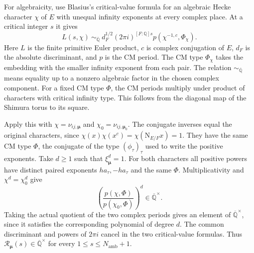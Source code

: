 For algebraicity, use Blasius's critical-value formula for an
algebraic Hecke character \(\chi\) of \(E\) with unequal infinity
exponents at every complex place. At a critical integer \(s\) it gives
\[
  L(s,\chi)\ \sim_{\overline{\mathbb Q}}\
    d_F^{1/2}(2\pi i)^{[F:\mathbb Q]s}
    p(\chi^{-1,c},\Phi_\chi).
\]
Here \(L\) is the finite primitive Euler product, \(c\) is complex
conjugation of \(E\), \(d_F\) is the absolute discriminant, and
\(p\) is the CM period. The CM type \(\Phi_\chi\) takes the embedding
with the smaller infinity exponent from each pair. The relation
\(\sim_{\overline{\mathbb Q}}\) means equality up to a nonzero algebraic
factor in the chosen complex component. For a fixed CM type \(\Phi\),
the CM periods multiply under product of characters with critical
infinity type. This follows from the diagonal map of the Shimura
torus to its square.
\cite{blasius-hecke,blasius-period-relations}
\cite[\S1.2, Proposition~1.1 and Theorem~1.1]{lin-cm-periods}

Apply this with \(\chi=\nu_{ij,\boldsymbol\mu}\) and
\(\chi_0=\nu_{ij,\boldsymbol\mu_0}\). The conjugate inverses equal
the original characters, since \(\chi(x)\chi(x^c)=\chi(\mathrm N_{E/F}x)=1\).
They have the same CM type \(\Phi\), the conjugate of the type
\((\phi_\tau)_\tau\) used to write the positive exponents.
Take \(d\ge1\) such that \(\xi_{\boldsymbol\mu}^d=1\).
For both characters all positive powers have distinct paired
exponents \(ha_\tau,-ha_\tau\) and the same \(\Phi\). Multiplicativity
and \(\chi^d=\chi_0^d\) give
\[
  \left(\frac{p(\chi,\Phi)}{p(\chi_0,\Phi)}\right)^d
       \in\overline{\mathbb Q}^{\times}.
\]
Taking the actual quotient of the two complex periods gives an
element of \(\overline{\mathbb Q}^{\times}\), since it satisfies the
corresponding polynomial of degree \(d\). The common discriminant and
powers of \(2\pi i\) cancel in the two critical-value formulas. Thus
\(\mathcal R_{\boldsymbol\mu}(s)\in\overline{\mathbb Q}^{\times}\)
for every \(1\le s\le N_{\mathrm{amb}}+1\).

